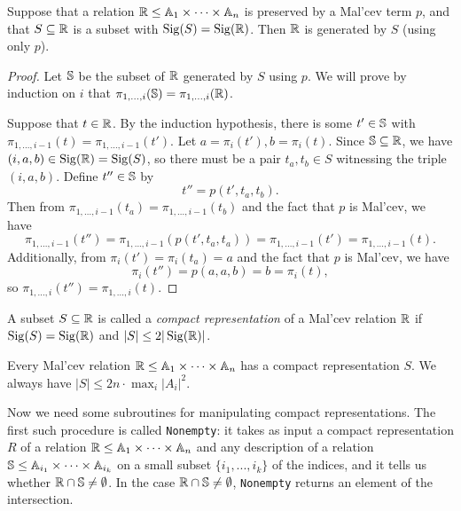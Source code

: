 \documentclass[letterpaper,11pt]{article}
\DeclareMathOperator{\Sig}{Sig}
\begin{document}
\begin{thm}\label{malcev-compact} Suppose that a relation $\mathbb{R} \le \mathbb{A}_1 \times \cdots \times \mathbb{A}_n$ is preserved by a Mal'cev term $p$, and that $S \subseteq \mathbb{R}$ is a subset with $\operatorname{Sig}(S) = \operatorname{Sig}(\mathbb{R})$. Then $\mathbb{R}$ is generated by $S$ (using only $p$).
\end{thm}
\begin{proof} Let $\mathbb{S}$ be the subset of $\mathbb{R}$ generated by $S$ using $p$. We will prove by induction on $i$ that $\pi_{1, ..., i}(\mathbb{S}) = \pi_{1, ..., i}(\mathbb{R})$.

Suppose that $t \in \mathbb{R}$. By the induction hypothesis, there is some $t' \in \mathbb{S}$ with $\pi_{1, ...,i-1}(t) = \pi_{1, ..., i-1}(t')$. Let $a = \pi_i(t'), b = \pi_i(t)$. Since $\mathbb{S} \subseteq \mathbb{R}$, we have $(i,a,b) \in \operatorname{Sig}(\mathbb{R}) = \operatorname{Sig}(S)$, so there must be a pair $t_a, t_b \in S$ witnessing the triple $(i,a,b)$. Define $t'' \in \mathbb{S}$ by
\[
t'' = p(t',t_a,t_b).
\]
Then from $\pi_{1, ...,i-1}(t_a) = \pi_{1, ..., i-1}(t_b)$ and the fact that $p$ is Mal'cev, we have
\[
\pi_{1, ...,i-1}(t'') = \pi_{1, ...,i-1}(p(t',t_a,t_a)) = \pi_{1, ...,i-1}(t') = \pi_{1, ...,i-1}(t).
\]
Additionally, from $\pi_i(t') = \pi_i(t_a) = a$ and the fact that $p$ is Mal'cev, we have
\[
\pi_i(t'') = p(a,a,b) = b = \pi_i(t),
\]
so $\pi_{1, ..., i}(t'') = \pi_{1, ..., i}(t)$.
\end{proof}

\begin{defn} A subset $S \subseteq \mathbb{R}$ is called a \emph{compact representation} of a Mal'cev relation $\mathbb{R}$ if $\Sig(S) = \Sig(\RR)$ and $|S| \le 2|\Sig(\RR)|$.
\end{defn}

\begin{prop} Every Mal'cev relation $\mathbb{R} \le \mathbb{A}_1 \times \cdots \times \mathbb{A}_n$ has a compact representation $S$. We always have $|S| \le 2n\cdot \max_i |A_i|^2$.
\end{prop}

Now we need some subroutines for manipulating compact representations. The first such procedure is called \texttt{Nonempty}: it takes as input a compact representation $R$ of a relation $\mathbb{R} \le \mathbb{A}_1 \times \cdots \times \mathbb{A}_n$ and any description of a relation $\mathbb{S} \le \mathbb{A}_{i_1} \times \cdots \times \mathbb{A}_{i_k}$ on a small subset $\{i_1, ..., i_k\}$ of the indices, and it tells us whether $\mathbb{R}\cap \mathbb{S} \ne \emptyset$. In the case $\mathbb{R} \cap \mathbb{S} \ne \emptyset$, \texttt{Nonempty} returns an element of the intersection.
\end{document}

